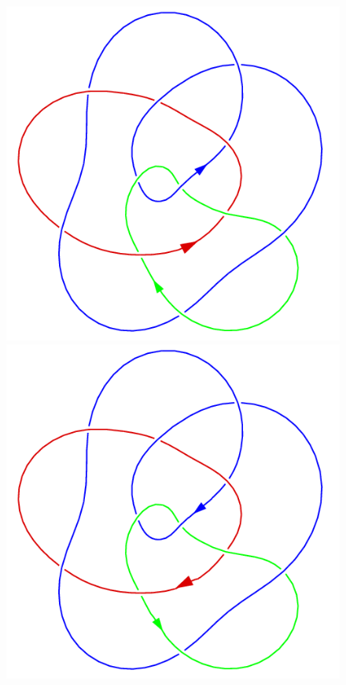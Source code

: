 \begin{definition}
\begin{figure}[H]
        \begin{minipage}[b]{.32\linewidth}
            \centering
            \includegraphics[width=\linewidth]{../data/link.png}
        \end{minipage}
        \begin{minipage}[b]{.32\linewidth}
            \centering
            \includegraphics[width=\linewidth]{../data/link_reverse.png}
        \end{minipage}
    \end{figure}
\end{definition}

